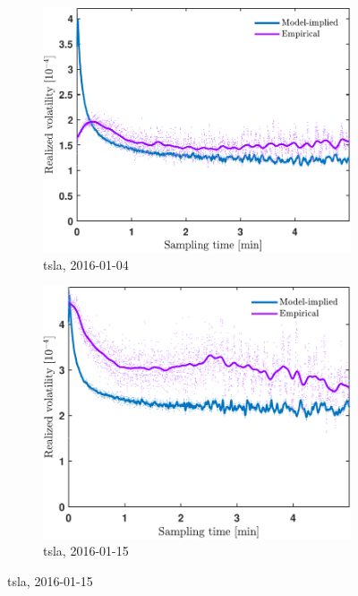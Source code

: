 \documentclass[11pt, a4paper]{thesis}  %
\begin{document}
\begin{figure}[H]
    \begin{subfigure}[b]{0.3\textwidth}
        \centering
        \includegraphics[width=\textwidth]{./SignaturePlot/TSLA/20160104/signature_plot_predicted_vs_measured.pdf}
        \caption{\ac{tsla}, 2016-01-04}
        \label{figure:results:signature_plot:tsla:20160104}
    \end{subfigure}
    \hfill
    \begin{subfigure}[b]{0.3\textwidth}
        \centering
        \includegraphics[width=\textwidth]{./SignaturePlot/TSLA/20160115/signature_plot_predicted_vs_measured.pdf}
        \caption{\ac{tsla}, 2016-01-15}

\end{subfigure}
\end{figure}
\end{document}
